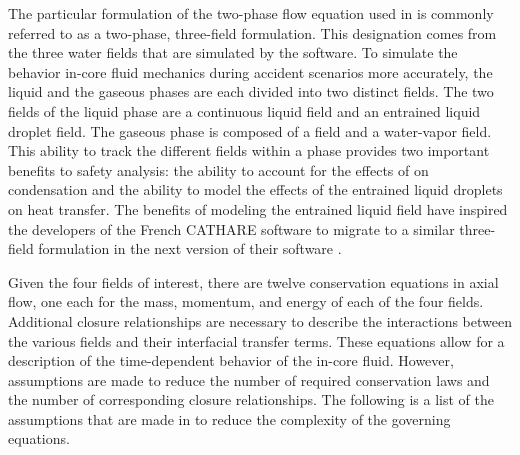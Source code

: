 The particular formulation of the two-phase flow equation used in \cobra{} is commonly referred to as a two-phase, three-field formulation.
This designation comes from the three water fields that are simulated by the software. 
To simulate the behavior in-core fluid mechanics during accident scenarios more accurately, the liquid and the gaseous phases are each divided into two distinct fields.
The two fields of the liquid phase are a continuous liquid field and an entrained liquid droplet field.
The gaseous phase is composed of a \ncg{} field and a water-vapor field. 
This ability to track the different fields within a phase provides two important benefits to safety analysis: the ability to account for the effects of \ncgs{} on condensation and the ability to model the effects of the entrained liquid droplets on heat transfer.
The benefits of modeling the entrained liquid field have inspired the developers of the French CATHARE software to migrate to a similar three-field formulation in the next version of their software \cite{Emonot2011}.

Given the four fields of interest, there are twelve conservation equations in axial flow, one each for the mass, momentum, and energy of each of the four fields.
Additional closure relationships are necessary to describe the interactions between the various fields and their interfacial transfer terms.
These equations allow for a description of the time-dependent behavior of the in-core fluid.
However, assumptions are made to reduce the number of required conservation laws and the number of corresponding closure relationships.
The following is a list of the assumptions that are made in \cobra{} to reduce the complexity of the governing equations.

